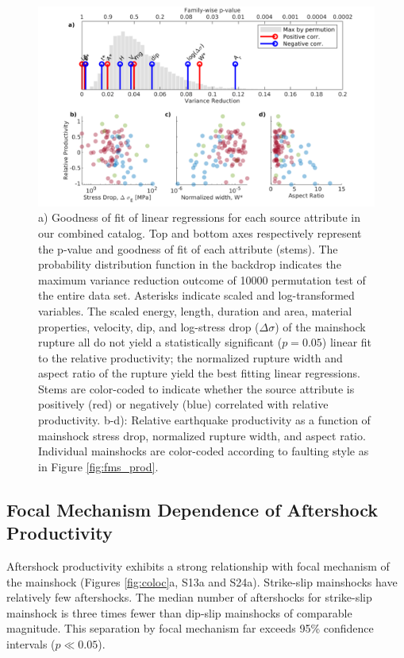\documentclass[draft, jgrga]{agujournal2018}
\begin{document}
    \begin{figure}
        \centering
        \includegraphics[width = \linewidth]{stem_plot.png}
        \caption{a) Goodness of fit of linear regressions for each source attribute in our combined catalog. Top and bottom axes respectively represent the p-value and goodness of fit of each attribute (stems). The probability distribution function in the backdrop indicates the maximum variance reduction outcome of 10000 permutation test of the entire data set. Asterisks indicate scaled and log-transformed variables. The scaled energy, length, duration and area, material properties, velocity, dip, and log-stress drop ($\Delta\sigma$) of the mainshock rupture all do not yield a statistically significant ($p=0.05$) linear fit to the relative productivity; the normalized rupture width and aspect ratio of the rupture yield the best fitting linear regressions. Stems are color-coded to indicate whether the source attribute is positively (red) or negatively (blue) correlated with relative productivity. b-d): Relative earthquake productivity as a function of mainshock stress drop, normalized rupture width, and aspect ratio. Individual mainshocks are color-coded according to faulting style as in Figure \ref{fig:fms_prod}.}
        \label{fig:r2_finite_fault}
    \end{figure}

    \subsection{Focal Mechanism Dependence of Aftershock Productivity}

    Aftershock productivity exhibits a strong relationship with focal mechanism of the mainshock (Figures \ref{fig:coloc}a, S13a and S24a). Strike-slip mainshocks have relatively few aftershocks. The median number of aftershocks for strike-slip mainshock is three times fewer than dip-slip mainshocks of comparable magnitude. This separation by focal mechanism far exceeds 95\% confidence intervals ($p\ll 0.05$).
\end{document}

